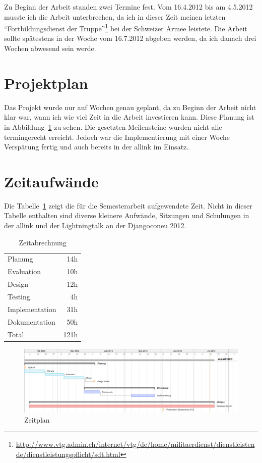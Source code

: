 Zu Beginn der Arbeit standen zwei Termine fest. Vom 16.4.2012 bis am 4.5.2012 musste ich die Arbeit unterbrechen, da ich in dieser Zeit meinen letzten ``Fortbildungsdienst der Truppe''\footnote{\url{http://www.vtg.admin.ch/internet/vtg/de/home/militaerdienst/dienstleistende/dienstleistungspflicht/sdt.html}} bei der Schweizer Armee leistete. Die Arbeit sollte spätestens in der Woche vom 16.7.2012 abgeben werden, da ich danach drei Wochen abwesend sein werde.

\section{Projektplan}
\label{sec:projektplan}
Das Projekt wurde nur auf Wochen genau geplant, da zu Beginn der Arbeit nicht klar war, wann ich wie viel Zeit in die Arbeit investieren kann. Diese Planung ist in Abbildung~\ref{fig:zeitplan} zu sehen. Die gesetzten Meilensteine wurden nicht alle termingerecht erreicht. Jedoch war die Implementierung mit einer Woche Verspätung fertig und auch bereits in der allink im Einsatz.

\section{Zeitaufwände}
\label{sec:zeitaufwände}
Die Tabelle~\ref{tab:zeitabrechnung} zeigt die für die Semesterarbeit aufgewendete Zeit. Nicht in dieser Tabelle enthalten sind diverse kleinere Aufwände, Sitzungen und Schulungen in der allink und der Lightningtalk an der Djangoconeu 2012.
\begin{table}[ht]
  \centering
  \begin{tabular}{lr}
    Planung & 14h \\
    Evaluation & 10h \\
    Design & 12h \\
    Testing & 4h \\
    Implementation & 31h \\
    Dokumentation & 50h \\
    \hline
    Total & 121h \\
  \end{tabular}
  \caption{Zeitabrechnung}
  \label{tab:zeitabrechnung}
\end{table}

\begin{figure}
  \centering
	\includegraphics[width=21cm, angle=90]{include/zeitplan.png}
	\caption{Zeitplan}
	\label{fig:zeitplan}
\end{figure}
